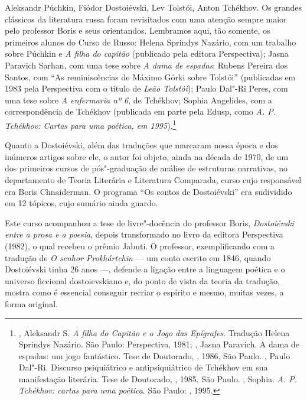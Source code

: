 Aleksandr Púchkin, Fiódor Dostoiévski, Lev Tolstói, Anton Tchékhov. Os grandes clássicos da literatura russa foram revisitados com uma atenção
sempre maior pelo professor Boris e seus orientandos. Lembramos aqui,
tão somente, os primeiros alunos do Curso de Russo: Helena Sprindys
Nazário, com um trabalho sobre Púchkin e \emph{A filha do capitão}
(publicado pela editora Perspectiva); Jasna Paravich Sarhan, com uma
tese sobre \emph{A dama de espadas}; Rubens Pereira dos Santos,
com ``As reminiscências de Máximo Górki sobre Tolstói'' (publicadas em
1983 pela Perspectiva com o título de \emph{Leão Tolstói}); Paulo Dal"-Ri
Peres, com uma tese sobre \emph{A enfermaria nº 6}, de Tchékhov; Sophia
Angelides, com a correspondência de Tchékhov (publicada em parte pela
Edusp, como \emph{A. P. Tchékhov: Cartas para uma poética, em
1995}).\footnote{, Aleksandr S. \emph{A filha do Capitão e o Jogo
  das Epígrafes}. Tradução Helena Sprindys Nazário. São Paulo:
  Perspectiva, 1981; , Jasna Paravich. A dama de espadas: um jogo
  fantástico. Tese de Doutorado, , 1986, São Paulo. , Paulo Dal"-Ri. Discurso psiquiátrico e
  antipsiquiátrico de Tchékhov em sua manifestação literária. Tese de
  Doutorado, , 1985, São Paulo. , Sophia. \emph{A. P.
  Tchékhov: cartas para uma poética}. São Paulo: , 1995.}

Quanto a Dostoiévski, além das traduções que marcaram nossa época e dos
inúmeros artigos sobre ele, o autor foi objeto, ainda na década de 1970,
de um dos primeiros cursos de pós"-graduação de análise de estruturas
narrativas, no departamento de Teoria Literária e Literatura Comparada,
curso cujo responsável era Boris Chnaiderman. O programa ``Os contos de
Dostoiévski'' era sudividido em 12 tópicos, cujo sumário ainda guardo.

Este curso acompanhou a tese de livre"-docência do professor Boris, \emph{Dostoiévski entre a prosa e a poesia}, depois transformado no livro da
editora Perspectiva (1982), o qual recebeu o prêmio Jabuti. O professor, exemplificando com a tradução
de \emph{O senhor Prokhártchin} --- um conto escrito em 1846, quando
Dostoiévski tinha 26 anos ---, defende a ligação entre a
linguagem poética e o universo ficcional dostoievskiano e, do ponto de
vista da teoria da tradução, mostra como é essencial conseguir recriar o
espírito e mesmo, muitas vezes, a forma original.

